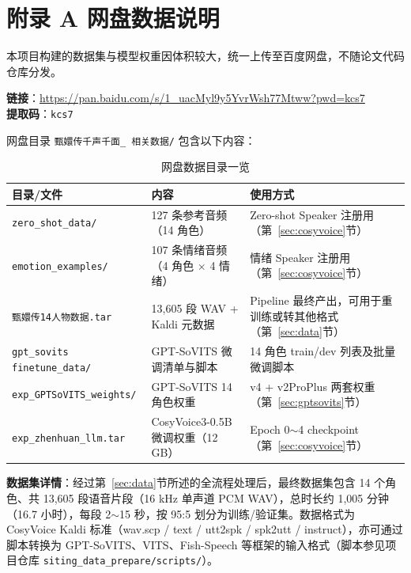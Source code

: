\documentclass[12pt,a4paper]{article}
\begin{document}
\newpage
{}
{}
\section*{附录 A \quad 网盘数据说明}

本项目构建的数据集与模型权重因体积较大，统一上传至百度网盘，不随论文代码仓库分发。

\noindent\hspace*{2em}\textbf{链接}：\url{https://pan.baidu.com/s/1\_uacMyl9y5YvrWsh77Mtww?pwd=kcs7} \\
\hspace*{2em}\textbf{提取码}：\texttt{kcs7}

网盘目录 \texttt{甄嬛传千声千面\_\,相关数据/} 包含以下内容：

\begin{table}[H]
\centering
\caption{网盘数据目录一览}
\label{tab:pan-data}
\renewcommand{\arraystretch}{1.4}
\begin{tabularx}{\textwidth}{p{4.5cm}p{4.0cm}X}
\toprule
\textbf{目录/文件} & \textbf{内容} & \textbf{使用方式} \\
\midrule
\rowcolor{Agray} \texttt{zero\_shot\_data/} & 127 条参考音频（14 角色）  & Zero-shot Speaker 注册用（第~\ref{sec:cosyvoice}节） \\
\texttt{emotion\_examples/}  & 107 条情绪音频（4 角色 $\times$ 4 情绪） & 情绪 Speaker 注册用（第~\ref{sec:cosyvoice}节） \\
\rowcolor{Agray} \texttt{甄嬛传14人物数据.tar} & 13,605 段 WAV + Kaldi 元数据 & Pipeline 最终产出，可用于重训练或转其他格式（第~\ref{sec:data}节） \\
\texttt{gpt\_sovits finetune\_data/} & GPT-SoVITS 微调清单与脚本 & 14 角色 train/dev 列表及批量微调脚本 \\
\rowcolor{Agray} \texttt{exp\_GPTSoVITS\_weights/} & GPT-SoVITS 14 角色权重 & v4 + v2ProPlus 两套权重（第~\ref{sec:gptsovits}节） \\
\texttt{exp\_zhenhuan\_llm.tar} & CosyVoice3-0.5B 微调权重（12 GB）& Epoch 0$\sim$4 checkpoint（第~\ref{sec:cosyvoice}节） \\
\bottomrule
\end{tabularx}
\end{table}

\textbf{数据集详情}：经过第~\ref{sec:data}节所述的全流程处理后，最终数据集包含 14 个角色、共 13,605 段语音片段（16 kHz 单声道 PCM WAV），总时长约 1,005 分钟（16.7 小时），每段 2$\sim$15 秒，按 95:5 划分为训练/验证集。数据格式为 CosyVoice Kaldi 标准（wav.scp / text / utt2spk / spk2utt / instruct），亦可通过脚本转换为 GPT-SoVITS、VITS、Fish-Speech 等框架的输入格式（脚本参见项目仓库 \texttt{siting\_data\_prepare/scripts/}）。
\end{document}
